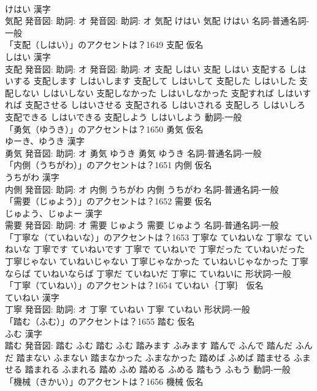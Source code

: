 \documentclass[8pt]{extreport}
\begin{document}
\begin{CJK}{UTF8}{min}
\\	けはい 漢字　
\\	気配 発音図: 助詞: オ 発音図: 助詞: オ	気配 けはい		気配 けはい				名詞-普通名詞-一般 
\\	「支配（しはい）」のアクセントは？1649	支配 仮名　
\\	しはい 漢字　
\\	支配 発音図: 助詞: オ 発音図: 助詞: オ	支配 しはい		支配 しはい 支配する しはいする 支配します しはいします 支配して しはいして 支配した しはいした 支配しない しはいしない 支配しなかった しはいしなかった 支配すれば しはいすれば 支配させる しはいさせる 支配される しはいされる 支配しろ しはいしろ 支配できる しはいできる 支配しよう しはいしよう				動詞-一般 
\\	「勇気（ゆうき）」のアクセントは？1650	勇気 仮名　
\\	ゆーき、ゆうき 漢字　
\\	勇気 発音図: 助詞: オ	勇気 ゆうき		勇気 ゆうき				名詞-普通名詞-一般 
\\	「内側（うちがわ）」のアクセントは？1651	内側 仮名　
\\	うちがわ 漢字　
\\	内側 発音図: 助詞: オ	内側 うちがわ		内側 うちがわ				名詞-普通名詞-一般 
\\	「需要（じゅよう）」のアクセントは？1652	需要 仮名　
\\	じゅよう、じゅよー 漢字　
\\	需要 発音図: 助詞: オ	需要 じゅよう		需要 じゅよう				名詞-普通名詞-一般 
\\	「丁寧な（ていねいな）」のアクセントは？1653		丁寧な ていねいな		丁寧な ていねいな 丁寧です ていねいです 丁寧で ていねいで 丁寧だった ていねいだった 丁寧じゃない ていねいじゃない 丁寧じゃなかった ていねいじゃなかった 丁寧ならば ていねいならば 丁寧だ ていねいだ 丁寧に ていねいに				形状詞-一般 
\\	「丁寧（ていねい）」のアクセントは？1654	ていねい｛丁寧｝ 仮名　
\\	ていねい 漢字　
\\	丁寧 発音図: 助詞: オ	丁寧 ていねい		丁寧 ていねい				形状詞-一般 
\\	「踏む（ふむ）」のアクセントは？1655	踏む 仮名　
\\	ふむ 漢字　
\\	踏む 発音図:	踏む ふむ		踏む ふむ 踏みます ふみます 踏んで ふんで 踏んだ ふんだ 踏まない ふまない 踏まなかった ふまなかった 踏めば ふめば 踏ませる ふませる 踏まれる ふまれる 踏め ふめ 踏める ふめる 踏もう ふもう				動詞-一般 
\\	「機械（きかい）」のアクセントは？1656	機械 仮名　

\end{CJK}
\end{document}

